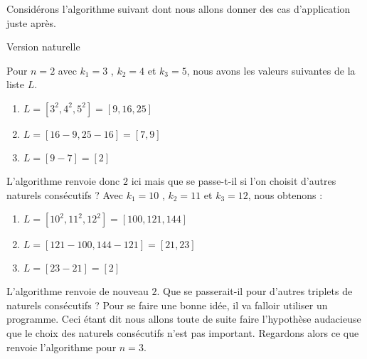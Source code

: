 Considérons l'algorithme suivant dont nous allons donner des cas d'application juste après.

\begin{algo}
	\caption{Version naturelle} \label{nat-algo}

	
	\addalgoblank
	
\end{algo}


Pour $n = 2$ avec $k_1 = 3$ , $k_2 = 4$ et $k_3 = 5$, nous avons les valeurs suivantes de la liste $L$.

\begin{enumerate}
	\item $L = [3^2 , 4^2 , 5^2] = [9 , 16 , 25]$

	\item $L = [16 - 9 , 25 - 16] = [7, 9]$

	\item $L = [9 - 7] = [2]$
\end{enumerate}


L'algorithme renvoie donc $2$ ici mais que se passe-t-il si l'on choisit d'autres naturels consécutifs ? Avec $k_1 = 10$ , $k_2 = 11$ et $k_3 = 12$, nous obtenons :

\begin{enumerate}
	\item $L = [10^2 , 11^2 , 12^2] = [100 , 121 , 144]$

	\item $L = [121 - 100 , 144 - 121] = [21 , 23]$

	\item $L = [23 - 21] = [2]$
\end{enumerate}


L'algorithme renvoie de nouveau $2$. Que se passerait-il pour d'autres triplets de naturels consécutifs ? Pour se faire une bonne idée, il va falloir utiliser un programme. Ceci étant dit nous allons toute de suite faire l'hypothèse audacieuse que le choix des naturels consécutifs n'est pas important. Regardons alors ce que renvoie l'algorithme pour $n = 3$.

